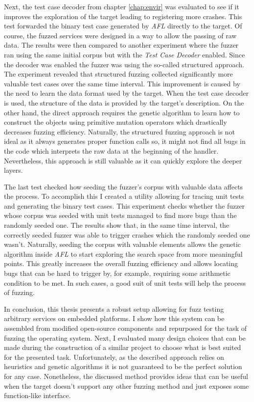 Next, the test case decoder from chapter \ref{chap:envir} was evaluated to see if it improves the exploration of the target leading to registering more crashes. This test forwarded the binary test case generated by \textit{AFL} directly to the target. Of course, the fuzzed services were designed in a way to allow the passing of raw data. The results were then compared to another experiment where the fuzzer ran using the same initial corpus but with the \textit{Test Case Decoder} enabled. Since the decoder was enabled the fuzzer was using the so-called structured approach. The experiment revealed that structured fuzzing collected significantly more valuable test cases over the same time interval. This improvement is caused by the need to learn the data format used by the target. When the test case decoder is used, the structure of the data is provided by the target's description. On the other hand, the direct approach requires the genetic algorithm to learn how to construct the objects using primitive mutation operators which drastically decreases fuzzing efficiency. Naturally, the structured fuzzing approach is not ideal as it always generates proper function calls so, it might not find all bugs in the code which interprets the raw data at the beginning of the handler. Nevertheless, this approach is still valuable as it can quickly explore the deeper layers.

The last test checked how seeding the fuzzer's corpus with valuable data affects the process. To accomplish this I created a utility allowing for tracing unit tests and generating the binary test cases. This experiment checks whether the fuzzer whose corpus was seeded with unit tests managed to find more bugs than the randomly seeded one. The results show that, in the same time interval, the correctly seeded fuzzer was able to trigger crashes which the randomly seeded one wasn't. Naturally, seeding the corpus with valuable elements allows the genetic algorithm inside \textit{AFL} to start exploring the search space from more meaningful points. This greatly increases the overall fuzzing efficiency and allows locating bugs that can be hard to trigger by, for example, requiring some arithmetic condition to be met. In such cases, a good suit of unit tests will help the process of fuzzing.

In conclusion, this thesis presents a robust setup allowing for fuzz testing arbitrary services on embedded platforms. I show how this system can be assembled from modified open-source components and repurposed for the task of fuzzing the operating system. Next, I evaluated many design choices that can be made during the construction of a similar project to choose what is best suited for the presented task. Unfortunately, as the described approach relies on heuristics and genetic algorithms it is not guaranteed to be the perfect solution for any case. Nonetheless, the discussed method provides ideas that can be useful when the target doesn't support any other fuzzing method and just exposes some function-like interface.
